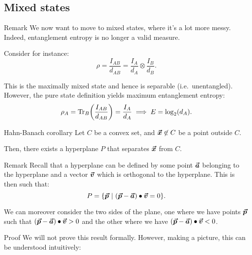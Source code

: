 \documentclass[a4paper]{article}
\begin{document}
\subsection{Mixed states}

\begin{parag}{Remark}
    We now want to move to mixed states, where it's a lot more messy. Indeed, entanglement entropy is no longer a valid measure.

    Consider for instance: 
    \[\rho = \frac{I_{AB}}{d_{AB}} = \frac{I_A}{d_A} \otimes \frac{I_B}{d_B}.\]

    This is the maximally mixed state and hence is separable (i.e.~unentangled). However, the pure state definition yields maximum entanglement entropy: 
    \[\rho_A = \Tr_B\left(\frac{I_{AB}}{d_{AB}}\right) = \frac{I_A}{d_A} \implies E = \log_2\left(d_A\right).\]
\end{parag}

\begin{parag}{Hahn-Banach corollary}
    Let $C$ be a convex set, and $\bm{\protect\vec{x}} \not\in C$ be a point outside $C$.

    Then, there exists a hyperplane $P$ that separates $\bm{\protect\vec{x}}$ from $C$.

    \begin{subparag}{Remark}
        Recall that a hyperplane can be defined by some point $\bm{\protect\vec{a}}$ belonging to the hyperplane and a vector $\bm{\protect\vec{v}}$ which is orthogonal to the hyperplane. This is then such that:
        \[P = \left\{\bvec{p} \suchthat \left(\bvec{p} - \bvec{a}\right) \dotprod \bvec{v} = 0\right\}.\]

        We can moreover consider the two sides of the plane, one where we have points $\bm{\protect\vec{p}}$ such that $\left(\bvec{p} - \bvec{a}\right) \dotprod \bvec{v} > 0$ and the other where we have $\left(\bvec{p} - \bvec{a}\right) \dotprod \bvec{v} < 0$.
    \end{subparag}

    \begin{subparag}{Proof}
        We will not prove this result formally. However, making a picture, this can be understood intuitively:
    \end{subparag}
\end{parag}
\end{document}
